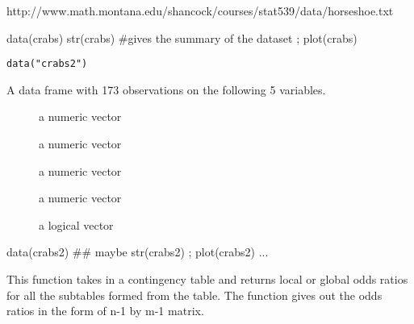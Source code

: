 \documentclass[letterpaper]{book}
\begin{document}
%
\begin{Source}\relax
http://www.math.montana.edu/shancock/courses/stat539/data/horseshoe.txt
\end{Source}
%
\begin{Examples}
\begin{ExampleCode}
data(crabs)
str(crabs) #gives the summary of the dataset ; 
plot(crabs) 
  
\end{ExampleCode}
\end{Examples}
%
\begin{Usage}
\begin{verbatim}
data("crabs2")
\end{verbatim}
\end{Usage}
%
\begin{Format}
A data frame with 173 observations on the following 5 variables.
\begin{description}

\item[] a numeric vector
\item[] a numeric vector
\item[] a numeric vector
\item[] a numeric vector
\item[] a logical vector

\end{description}

\end{Format}
%
\begin{Examples}
\begin{ExampleCode}
data(crabs2)
## maybe str(crabs2) ; plot(crabs2) ...
\end{ExampleCode}
\end{Examples}
%
\begin{Description}\relax
This function takes in a contingency table and returns local or global odds ratios for all the subtables formed from the table. 
The function gives out the odds ratios in the form of n-1 by m-1 matrix.
\end{Description}
\end{document}
